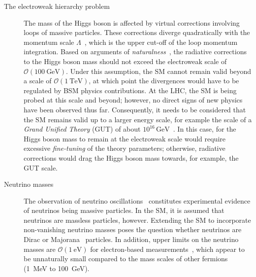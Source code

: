 \begin{description}
\item[The electroweak hierarchy problem] The mass of the Higgs boson is affected
  by virtual corrections involving loops of massive particles. These corrections
  diverge quadratically with the momentum scale $\Lambda$~\cite{Giudice:2008bi},
  which is the upper cut-off of the loop momentum integration. Based on
  arguments of
  \emph{naturalness}~\cite{Gildener:1976ai,Weinberg:1978ym,Susskind:1978ms,Giudice:2008bi},
  the radiative corrections to the Higgs boson mass should not exceed the
  electroweak scale of $\mathcal{O}(\SI{100}{\GeV})$. Under this assumption, the
  SM cannot remain valid beyond a scale of $\mathcal{O}(\SI{1}{\TeV})$, at which
  point the divergences would have to be regulated by BSM physics
  contributions. At the LHC, the SM is being probed at this scale and beyond;
  however, no direct signs of new physics have been observed thus
  far. Consequently, it needs to be considered that the SM remains valid up to a
  larger energy scale, for example the scale of a \emph{Grand Unified Theory}
  (GUT) of about $10^{16}\,\si{\GeV}$~\cite{pdg2020}. In this case, for the
  Higgs boson mass to remain at the electroweak scale would require excessive
  \emph{fine-tuning} of the theory parameters; otherwise, radiative corrections
  would drag the Higgs boson mass towards, for example, the GUT scale.

\item[Neutrino masses] The observation of neutrino
  oscillations~\cite{Super-Kamiokande:1998kpq,SNO:2002tuh} constitutes
  experimental evidence of neutrinos being massive particles. In the SM, it is
  assumed that neutrinos are massless particles, however. Extending the SM to
  incorporate non-vanishing neutrino masses poses the question whether neutrinos
  are Dirac or Majorana~\cite{Majorana:1937vz} particles. In addition, upper
  limits on the neutrino masses are $\mathcal{O}(\SI{1}{\electronvolt})$ for
  electron-based measurements~\cite{KATRIN:2019yun}, which
  appear to be unnaturally small compared to the mass scales of other fermions
  (\SI{1}{\MeV} to \SI{100}{\GeV}).



\end{description}
